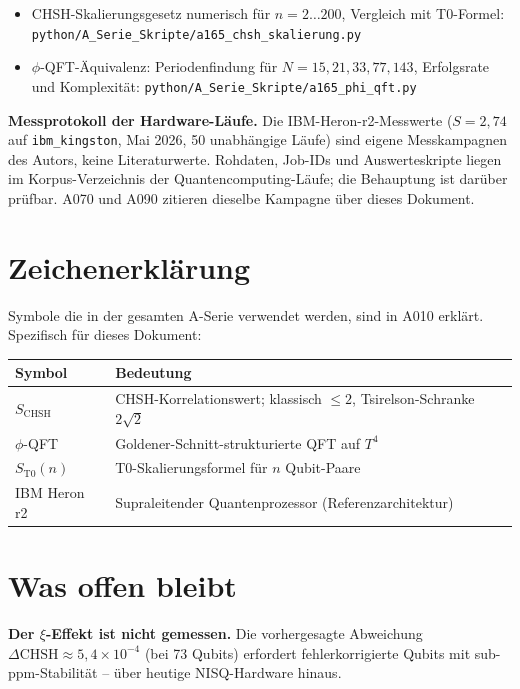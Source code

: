 \begin{itemize}[leftmargin=2em,itemsep=2pt,topsep=2pt]
  \item CHSH-Skalierungsgesetz numerisch für $n=2\ldots200$, Vergleich mit T0-Formel:
    \texttt{python/A\_Serie\_Skripte/a165\_chsh\_skalierung.py}
  \item $\phi$-QFT-Äquivalenz: Periodenfindung für $N=15,21,33,77,143$,
    Erfolgsrate und Komplexität:
    \texttt{python/A\_Serie\_Skripte/a165\_phi\_qft.py}
\end{itemize}

\textbf{Messprotokoll der Hardware-Läufe.} Die IBM-Heron-r2-Messwerte
($S=2{,}74$ auf \texttt{ibm\_kingston}, Mai 2026, 50 unabhängige Läufe)
sind eigene Messkampagnen des Autors, keine Literaturwerte. Rohdaten,
Job-IDs und Auswerteskripte liegen im Korpus-Verzeichnis der
Quantencomputing-Läufe; die Behauptung ist darüber prüfbar. A070 und A090
zitieren dieselbe Kampagne über dieses Dokument.


\section{Zeichenerklärung}

Symbole die in der gesamten A-Serie verwendet werden, sind in A010 erklärt.
Spezifisch für dieses Dokument:

\begin{center}
\renewcommand{\arraystretch}{1.3}
{\small\begin{tabular}{lp{9cm}}
\toprule
Symbol & Bedeutung \\
\midrule
$S_\text{CHSH}$ & CHSH-Korrelationswert; klassisch $\leq2$, Tsirelson-Schranke $2\sqrt2$ \\
$\phi$-QFT & Goldener-Schnitt-strukturierte QFT auf $T^4$ \\
$S_\text{T0}(n)$ & T0-Skalierungsformel für $n$ Qubit-Paare \\
IBM Heron r2 & Supraleitender Quantenprozessor (Referenzarchitektur) \\
\bottomrule
\end{tabular}}
\renewcommand{\arraystretch}{1.0}
\end{center}

\section{Was offen bleibt}

\textbf{Der $\xi$-Effekt ist nicht gemessen.} Die vorhergesagte Abweichung
$\Delta\text{CHSH}\approx5{,}4\times10^{-4}$ (bei 73 Qubits) erfordert
fehlerkorrigierte Qubits mit sub-ppm-Stabilität -- über heutige NISQ-Hardware
hinaus.

